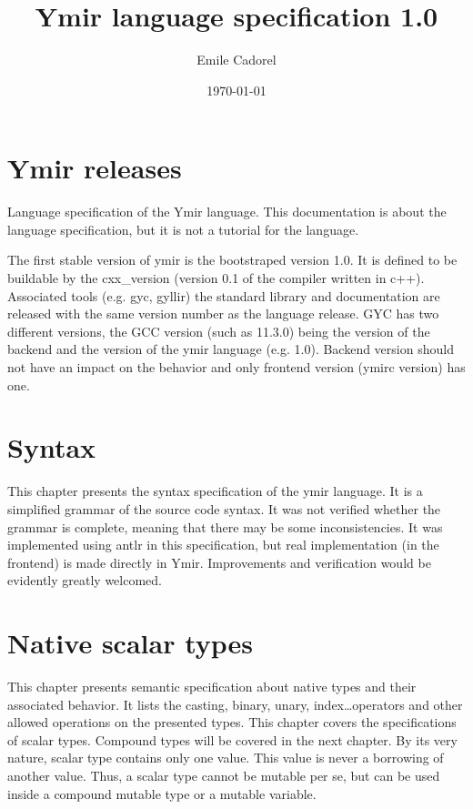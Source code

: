 \documentclass[a4paper,11pt]{book}
\author{Emile Cadorel}
\date{\today}
\title{Ymir language specification 1.0}
\begin{document}

\maketitle
\dominitoc
\dominilof
\dominilot

\chapter{Ymir releases}

Language specification of the Ymir language. This documentation is about the
language specification, but it is not a tutorial for the language.

The first stable version of ymir is the bootstraped version 1.0. It is defined to be buildable by the cxx\_version (version 0.1 of the compiler written in c++). Associated tools (e.g. gyc, gyllir) the standard library and documentation are released with the same version number as the language release. GYC has two different versions, the GCC version (such as 11.3.0) being the version of the backend and the version of the ymir language (e.g. 1.0). Backend version should not have an impact on the behavior and only frontend version (ymirc version) has one.

\begin{multicols}{2}
  \tableofcontents
\end{multicols}


\chapter{Syntax}

This chapter presents the syntax specification of the ymir language. It is a
simplified grammar of the source code syntax. It was not verified whether the
grammar is complete, meaning that there may be some inconsistencies. It was
implemented using antlr in this specification, but real implementation (in the
frontend) is made directly in Ymir. Improvements and verification would be
evidently greatly welcomed.

\minitoc%


\chapter{Native scalar types}

This chapter presents semantic specification about native types and their
associated behavior. It lists the casting, binary, unary, index\ldots operators
and other allowed operations on the presented types. This chapter covers the
specifications of scalar types. Compound types will be covered in the next
chapter. By its very nature, scalar type contains only one value. This value is
never a borrowing of another value. Thus, a scalar type cannot be mutable per
se, but can be used inside a compound mutable type or a mutable variable.
\end{document}

